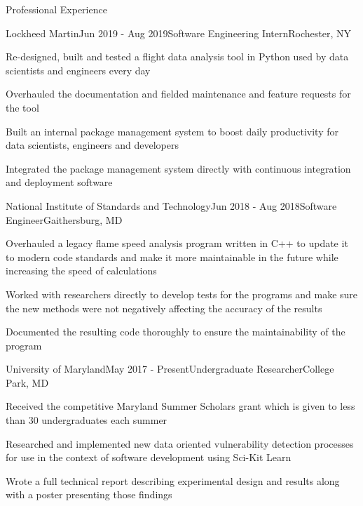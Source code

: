\documentclass{resume} %
\begin{document}
\begin{rSection}{Professional Experience}


\begin{rSubsection}{Lockheed Martin}{Jun 2019 - Aug 2019}{Software Engineering Intern}{Rochester, NY}
\item Re-designed, built and tested a flight data analysis tool in Python used by data scientists and engineers every day
\item Overhauled the documentation and fielded maintenance and feature requests for the tool
\item Built an internal package management system to boost daily productivity for data scientists, engineers and developers
\item Integrated the package management system directly with continuous integration and deployment software
\end{rSubsection}


\begin{rSubsection}{National Institute of Standards and Technology}{Jun 2018 - Aug 2018}{Software Engineer}{Gaithersburg, MD}
\item Overhauled a legacy flame speed analysis program written in C++ to update it to modern code standards and make it more maintainable in the future while increasing the speed of calculations
\item Worked with researchers directly to develop tests for the programs and make sure the new methods were not negatively affecting the accuracy of the results
\item Documented the resulting code thoroughly to ensure the maintainability of the program
\end{rSubsection}


\begin{rSubsection}{University of Maryland}{May 2017 - Present}{Undergraduate Researcher}{College Park, MD}
\item Received the competitive Maryland Summer Scholars grant which is given to less than 30 undergraduates each summer
\item Researched and implemented new data oriented vulnerability detection processes for use in the context of software development using Sci-Kit Learn
\item Wrote a full technical report describing experimental design and results along with a poster presenting those findings
\end{rSubsection}


\end{rSection}
\end{document}
